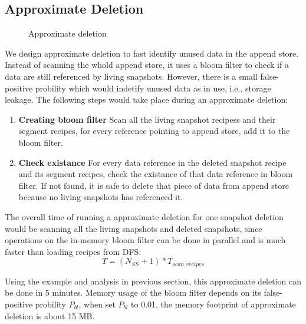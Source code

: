 \subsection{Approximate Deletion}
\begin{figure}[htbp]
  \centering
  \caption{Approximate deletion}
  \label{fig:deletion_flow}
\end{figure}

We design approximate deletion to fast identify unused data in the append store.
Instead of scanning the whold append store, it uses a bloom filter to check 
if a data are still referenced by living snapshots. However, there is a small false-positive probility which
would indetify unused data as in use, i.e., storage leakage.
The following steps would take place during an approximate deletion:

\begin{enumerate}
\item {\bf Creating bloom filter} Scan all the living snapshot recipess and their segment recipes,
for every reference pointing to append store, add it to the bloom filter.
\item {\bf Check existance} For every data reference in the deleted snapshot recipe and its segment recipes,
check the existance of that data reference in bloom filter. If not found, it is safe to delete that piece of data from append store
because no living snapshots has referenced it.
\end{enumerate}

The overall time of running a approximate deletion for one snapshot deletion would be scanning
all the living snapshots and deleted snapshots, since operations on the in-memory bloom filter can be done in
parallel and is much faster than loading recipes from DFS:
\begin{equation}
T = (N_{SS} + 1) * T_{scan\_recipes}
\end{equation}
 
Using the example and analysis in previous section, this approximate deletion can be done in 5 minutes. 
Memory usage of the bloom filter depends on its false-positive probility $P_{bl}$,
when set $P_{bl}$ to 0.01, the memory footprint of approximate deletion is about 15 MB.

